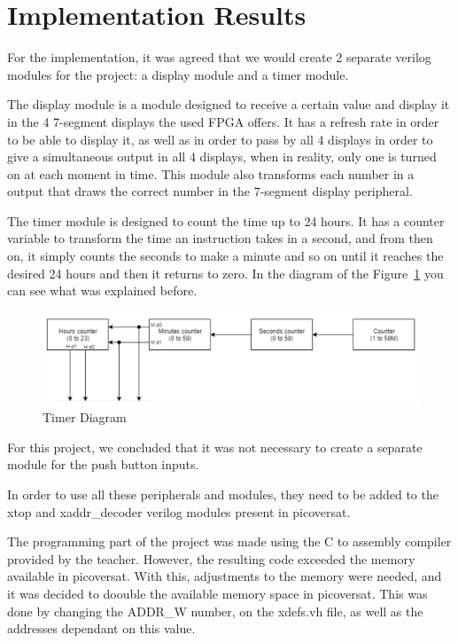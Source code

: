 \section{Implementation Results}
\label{sec:ir}

For the implementation, it was agreed that we would create 2 separate verilog modules for the project: a display module and a timer module.

The display module is a module designed to receive a certain value and display it in the 4 7-segment displays the used FPGA offers. It has a refresh rate in order to be able to display it, as well as in order to pass by all 4 displays in order to give a simultaneous output in all 4 displays, when in reality, only one is turned on at each moment in time. This module also transforms each number in a output that draws the correct number in the 7-segment display peripheral.

The timer module is designed to count the time up to 24 hours. It has a counter variable to transform the time an instruction takes in a second, and from then on, it simply counts the seconds to make a minute and so on until it reaches the desired 24 hours and then it returns to zero. In the diagram of the Figure~\ref{fig:Timer} you can see what was explained before.

\begin{figure}[!htbp]
    \centerline{\includegraphics[width=15cm]{figures/83318261_480857235875450_5951662157752958976_n.png}}
    \vspace{0cm}\caption{Timer Diagram}
    \label{fig:Timer}
\end{figure}


For this project, we concluded that it was not necessary to create a separate module for the push button inputs.

In order to use all these peripherals and modules, they need to be added to the xtop and xaddr\_decoder verilog modules present in picoversat.

The programming part of the project was made using the C to assembly compiler provided by the teacher. However, the resulting code exceeded the memory available in picoversat. With this, adjustments to the memory were needed, and it was decided to doouble the available memory space in picoversat. This was done by changing the ADDR\_W number, on the xdefs.vh file, as well as the addresses dependant on this value.


